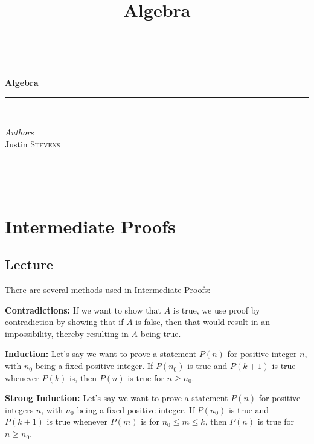 \documentclass[12pt,openany]{book}
\title{Algebra}
\theoremstyle{definition}
\theoremstyle{definition}
\newcommand{\HRule}{\rule{\linewidth}{0.5mm}} %
\begin{document}
 

\begin{center}
\HRule \\[0.4cm]
{ \huge \bfseries Algebra}\\[0.4cm] %
\HRule \\[1.5cm]
\begin{minipage}{0.4\textwidth}
\begin{flushleft} \large
\emph{Authors}\\
Justin \textsc{Stevens} \newline
\end{flushleft}
\end{minipage}
~
\begin{minipage}{0.4\textwidth}
\begin{flushright} \large

\end{flushright}
\end{minipage}\\[0.5cm]
\end{center}
\chapter{Intermediate Proofs}

\section{Lecture}

There are several methods used in Intermediate Proofs:  

\textbf{Contradictions:}  If we want to show that $A$ is true, we use proof by contradiction by showing that if $A$ is false, then that would result in an impossibility, thereby resulting in $A$ being true.  

\textbf{Induction:}  Let's say we want to prove a statement $P(n)$ for positive integer $n$, with $n_0$ being a fixed positive integer.  If $P(n_0)$ is true and $P(k+1)$ is true whenever $P(k)$ is, then $P(n)$ is true for $n\ge n_0$.  

\textbf{Strong Induction:}  Let's say we want to prove a statement $P(n)$ for positive integers $n$, with $n_0$ being a fixed positive integer.  If $P(n_0)$ is true and $P(k+1)$ is true whenever $P(m)$ is for $n_0 \le m\le k$, then $P(n)$ is true for $n\ge n_0$.
\end{document}
